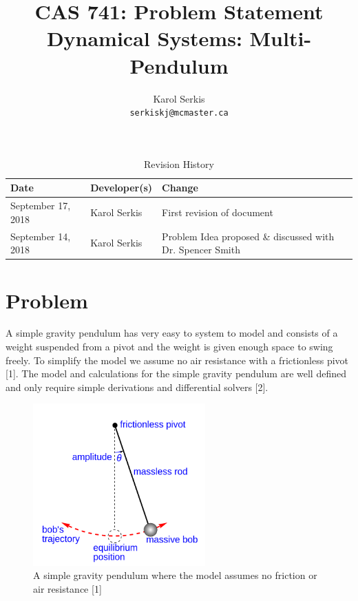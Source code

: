 \documentclass{article}
\title{CAS 741: Problem Statement\\[10pt]\Large Dynamical Systems: Multi-Pendulum }
\author{Karol Serkis\\\texttt{serkiskj@mcmaster.ca}}
\date{}
\begin{document}

\maketitle

\begin{table}[hp]
\caption{Revision History} \label{TblRevisionHistory}
\begin{tabularx}{\textwidth}{llX}
\toprule
\textbf{Date} & \textbf{Developer(s)} & \textbf{Change}\\
\midrule
September 17, 2018 & Karol Serkis & First revision of document\\

September 14, 2018 & Karol Serkis & Problem Idea proposed \& discussed with Dr. Spencer Smith \\
\bottomrule
\end{tabularx}
\end{table}


\section*{Problem}


A simple gravity pendulum has very easy to system to model and consists of a
weight suspended from a pivot and the weight is given enough space to swing
freely. To simplify the model we assume no air resistance with a frictionless
pivot [1]. The model and calculations for the simple gravity pendulum are well
defined and only require simple derivations and differential solvers
[2]. 
\begin{figure}[H]
	\centering
	\includegraphics[width=250px]{simple-pend.png}
	\caption{A simple gravity pendulum where the model assumes no friction or air resistance [1]}
	\label{fig:maxresdefault}
\end{figure}
\end{document}

